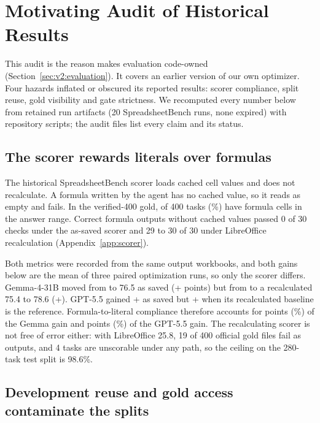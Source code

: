 \section{Motivating Audit of Historical Results}
\label{app:hist}

This audit is the reason \capevolve{} makes evaluation code-owned (Section~\ref{sec:v2:evaluation}). It covers an earlier version of our own optimizer. Four hazards inflated or obscured its reported results: scorer compliance, split reuse, gold visibility and gate strictness. We recomputed every number below from retained run artifacts (20 SpreadsheetBench runs, none expired) with repository scripts; the audit files list every claim and its status.



\subsection*{The scorer rewards literals over formulas}

The historical SpreadsheetBench scorer loads cached cell values and does not recalculate. A formula written by the agent has no cached value, so it reads as empty and fails. In the verified-400 gold, \histFormulaGoldTasks{} of 400 tasks (\histFormulaGoldPct{}\%) have formula cells in the answer range. Correct formula outputs without cached values passed 0 of 30 checks under the as-saved scorer and 29 to 30 of 30 under LibreOffice recalculation (Appendix~\ref{app:scorer}).

Both metrics were recorded from the same output workbooks, and both gains below are the mean of three paired optimization runs, so only the scorer differs. Gemma-4-31B moved from \histGemmaBaseSaved{} to 76.5 as saved (+\histGemmaDeltaSaved{} points) but from \histGemmaBaseRecalc{} to a recalculated 75.4 to 78.6 (+\histGemmaDeltaRecalc{}). GPT-5.5 gained +\histGptDeltaSaved{} as saved but +\histGptDeltaRecalc{} when its \histGptBaseRecalc{} recalculated baseline is the reference. Formula-to-literal compliance therefore accounts for \histGemmaCompliancePts{} points (\histGemmaComplianceShare{}\%) of the Gemma gain and \histGptCompliancePts{} points (\histGptComplianceShare{}\%) of the GPT-5.5 gain. The recalculating scorer is not free of error either: with LibreOffice 25.8, 19 of 400 official gold files fail as outputs, and 4 tasks are unscorable under any path, so the ceiling on the 280-task test split is 98.6\%.

\subsection*{Development reuse and gold access contaminate the splits}

